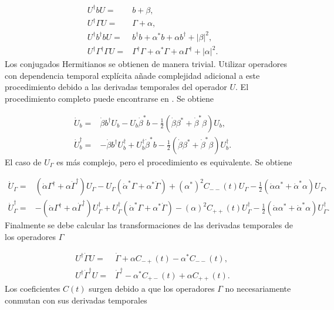 \documentclass[10pt,a4paper]{report}
\begin{document}
\begin{align}
U^\dagger b U =& b + \beta,\\
U^\dagger \Gamma U =& \Gamma + \alpha,\\
U^\dagger b^\dagger b U =& b^\dagger b + \alpha^* b + \alpha b^\dagger +|\beta|^2,\\
U^\dagger \Gamma^\dagger \Gamma U =& \Gamma^\dagger \Gamma + \alpha^* \Gamma + \alpha \Gamma^\dagger +|\alpha|^2.
\end{align} Los conjugados Hermitianos se obtienen de manera trivial. Utilizar operadores con dependencia temporal explícita añade complejidad adicional a este procedimiento debido a las derivadas temporales del operador $U$. El procedimiento completo puede encontrarse en \cite{TesisMaestria}. Se obtiene

\begin{align}
\dot{U}_b=&\dot{\beta} b^\dagger U_b - U_b\dot{\beta}^*b - \frac{1}{2}(\dot{\beta} \beta^*+\dot{\beta}^* \beta)U_b,\\
\dot{U}_b^\dagger=&-\dot{\beta} b^\dagger U_b^\dagger + U_b^\dagger\dot{\beta}^*b - \frac{1}{2}(\dot{\beta} \beta^*+\dot{\beta}^* \beta)U_b^\dagger.
\end{align} El caso de $U_\Gamma$ es más complejo, pero el procedimiento es equivalente. Se obtiene

\begin{align}
\dot{U}_\Gamma =&(\dot{\alpha}\Gamma^\dagger +\alpha \dot{\Gamma}^\dagger)U_\Gamma - U_\Gamma(\dot{\alpha}^*\Gamma+\alpha^* \dot{\Gamma}) + (\alpha^*)^2 C_{--}(t)U_\Gamma-\frac{1}{2}(\dot{\alpha} \alpha^*+\dot{\alpha}^* \alpha)U_\Gamma, \\
\dot{U}^\dagger_\Gamma=&-(\dot{\alpha}\Gamma^\dagger +\alpha \dot{\Gamma}^\dagger)U_\Gamma^\dagger + U_\Gamma^\dagger(\dot{\alpha}^*\Gamma+\alpha^* \dot{\Gamma}) - (\alpha)^2 C_{++}(t)U_\Gamma^\dagger-\frac{1}{2}(\dot{\alpha} \alpha^*+\dot{\alpha}^* \alpha)U_\Gamma^\dagger.
\end{align} Finalmente se debe calcular las transformaciones de las derivadas temporales de los operadores $\Gamma$

\begin{align}
U^{\dagger}\dot{\Gamma}U =& \dot{\Gamma} + \alpha C_{-+}(t) -\alpha^* C_{--}(t),\\
U^{\dagger}\dot{\Gamma}^\dagger U =& \dot{\Gamma}^\dagger - \alpha^* C_{+-}(t) +\alpha C_{++}(t). 
\end{align} Los coeficientes $C(t)$ surgen debido a que los operadores $\Gamma$ no necesariamente conmutan con sus derivadas temporales
\end{document}
